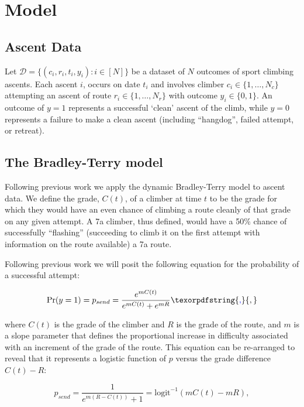 \documentclass[12pt]{article}
\providecommand{\DIFaddtex}[1]{{\protect\color{blue}\uwave{#1}}} %
\providecommand{\DIFaddbegin}{} %
\providecommand{\DIFaddend}{} %
\providecommand{\DIFadd}[1]{\texorpdfstring{\DIFaddtex{#1}}{#1}} %
\newcommand{\DIFaddincludegraphics}[2][]{{\color{blue}\fbox{\DIFOincludegraphics[#1]{#2}}}} %
\DeclareRobustCommand{\DIFaddbegin}{\DIFOaddbegin \let\includegraphics\DIFaddincludegraphics} %
\DeclareRobustCommand{\DIFaddend}{\DIFOaddend \let\includegraphics\DIFOincludegraphics} %
\begin{document}
\DIFaddend \section{Model}

\subsection{Ascent Data}

Let $\mathcal{D} = \{(c_i, r_i, t_i, y_i) : i \in [N]\}$ be a dataset of $N$ outcomes of sport climbing ascents.  Each ascent $i$, occurs on date $t_i$ and involves climber $c_i \in \{1,\dots, N_c\}$ attempting an ascent of route $r_i \in \{1,\dots, N_r\}$ with outcome $y_i \in \{0,1\}$. An outcome of $y=1$ represents a successful `clean' ascent of the climb, while $y=0$ represents a failure to make a clean ascent (including ``\gls{hangdog}'', failed attempt, or retreat).

\subsection{The Bradley-Terry model}

Following previous work  \citep{scarff2020estimation} we apply the dynamic Bradley-Terry model \citep{zermelo1929berechnung,bradley1952rank} to ascent data. We define the grade, $C(t)$, of a climber at time $t$ to be the grade for which they would have an even chance of climbing a route cleanly of that grade on any given attempt. A 7a climber, thus defined, would have a 50\% chance of successfully ``flashing'' (succeeding to climb it on the first attempt with information on the route available) a 7a route.

Following previous work \citep{scarff2020estimation} we will posit the following equation for the probability of a successful attempt:

\begin{equation}
\Pr(y = 1) = p_{send} = \frac{e^{mC(t)}}{e^{mC(t)} + e^{mR}}\DIFaddbegin \DIFadd{,
}\DIFaddend \end{equation}

where $C(t)$ is the grade of the climber and $R$ is the grade of the route, and $m$ is a slope parameter that defines the proportional increase in difficulty associated with an increment of the grade of the route. This equation can be re-arranged to reveal that it represents a logistic function of $p$ versus the grade difference $C(t)-R$:

\begin{equation}
p_{send} = \frac{1}{e^{m(R-C(t))} + 1} = \textrm{logit}^{-1}(mC(t)-mR),
\label{logisticp}
\end{equation}
\end{document}

